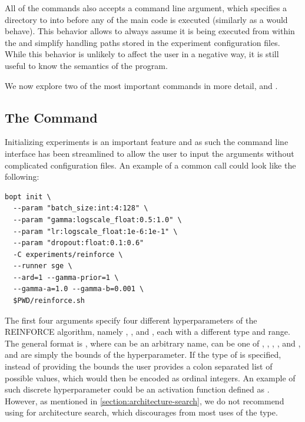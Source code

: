 All of the \bopt commands also accepts a  command line argument, which specifies a directory to  into before any of the main code is executed (similarly as a  would behave). This behavior allows \bopt to always assume it is being executed from within the  and simplify handling paths stored in the experiment configuration files. While this behavior is unlikely to affect the user in a negative way, it is still useful to know the semantics of the program.

We now explore two of the most important commands in more detail,  and .

\subsection{The  Command}

Initializing experiments is an important feature and as such the command line interface has been streamlined to allow the user to input the arguments without complicated configuration files. An example of a common  call could look like the following:

\begin{center}
\begin{verbatim}
bopt init \
  --param "batch_size:int:4:128" \
  --param "gamma:logscale_float:0.5:1.0" \
  --param "lr:logscale_float:1e-6:1e-1" \
  --param "dropout:float:0.1:0.6"
  -C experiments/reinforce \
  --runner sge \
  --ard=1 --gamma-prior=1 \
  --gamma-a=1.0 --gamma-b=0.001 \
  $PWD/reinforce.sh
\end{verbatim}	
\end{center}


The first four arguments specify four different hyperparameters of the REINFORCE algorithm, namely , ,  and , each with a different type and range. The general format is , where  can be an arbitrary name,  can be one of , , , , and , and  are simply the bounds of the hyperparameter. If the type of  is specified, instead of providing the bounds the user provides a colon separated list of possible values, which would then be encoded as ordinal integers. An example of such discrete hyperparameter could be an activation function defined as . However, as mentioned in \autoref{section:architecture-search}, we do not recommend using \bopt for architecture search, which discourages from most uses of the  type.

